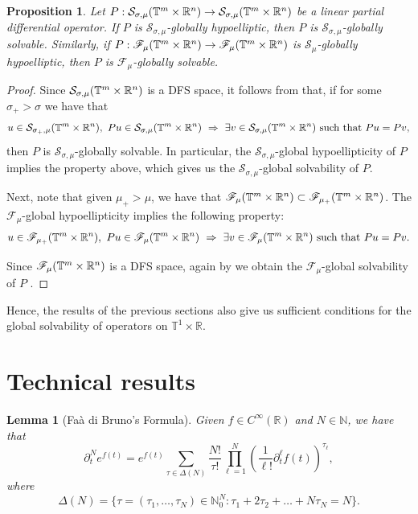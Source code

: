 \documentclass[11pt,reqno]{amsart}
\numberwithin{equation}{section}
\newtheorem{prop}[theorem]{Proposition}
\newtheorem{lemma}[theorem]{Lemma}
\theoremstyle{definition}
\theoremstyle{definition}
\newcommand{\T}{\mathbb{T}}
\newcommand{\G}{\mathnormal{\mathbb{T}^{m}\times\mathbb{R}^n}}
\newcommand{\R}{\mathbb{R}}
\newcommand{\N}{\mathbb{N}}
\renewcommand{\S}{\mathcal{S}_{\sigma,\mu}(\G)}
\begin{document}
\begin{prop}
    Let $P:\S\to\S$ be a linear partial differential operator. If $P$ is $\mathcal{S}_{\sigma,\mu}$-globally hypoelliptic, then $P$ is $\mathcal{S}_{\sigma,\mu}$-globally solvable. Similarly, if $P:\mathscr{F}_\mu(\G)\to \mathscr{F}_\mu(\G)$ is $\mathcal{S}_{\mu}$-globally hypoelliptic, then $P$ is $\mathscr{F}_{\mu}$-globally solvable.
\end{prop}
\begin{proof}
    Since $\S$ is a DFS space, it follows from \cite[Corollary 5.4]{AFR22proc} that, if for some $\sigma_+>\sigma$ we have that
    \[u\in\mathcal{S}_{\sigma_+,\mu}(\G),\ Pu\in\S\ \Rightarrow\ \exists v\in \mathcal{S}_{\sigma,\mu}(\G)\text{ such that }Pu=Pv,\]
    then $P$ is $\mathcal{S}_{\sigma,\mu}$-globally solvable. In particular, the $\mathcal{S}_{\sigma,\mu}$-global hypoellipticity of $P$ implies the property above, which gives us the $\mathcal{S}_{\sigma,\mu}$-global solvability of $P$. 
    
    Next, note that given $\mu_+>\mu$, we have that $\mathscr{F}_\mu(\G)\subset \mathscr{F}_{\mu_+}(\G)$. The $\mathscr{F}_\mu$-global hypoellipticity implies the following property:
    \[u\in\mathscr{F}_{\mu_+}(\G),\ Pu\in\mathscr{F}_\mu(\G)\ \Rightarrow\ \exists v\in \mathscr{F}_\mu(\G)\text{ such that }Pu=Pv.\]
    
  Since $\mathscr{F}_\mu(\G)$ is a DFS space, again by \cite[Corollary 5.4]{AFR22proc} we obtain the $\mathscr{F}_\mu$-global solvability of $P$ .
\end{proof}

Hence, the results of the previous sections also give us sufficient conditions for the global solvability of operators on $\T^1\times\R$.


\appendix\section{Technical results}\label{appendix}

\begin{lemma}[Fa\`a di Bruno's Formula]\label{faa}
	Given $f\in C^\infty(\mathbb{R})$ and $N\in\mathbb{N}$, we have that
	\begin{equation*}{\partial_t^N}e^{f(t)}=e^{f(t)}\displaystyle\sum_{\tau\in\Delta(N)}\dfrac{N!}{\tau!}\prod_{\ell=1}^{N}\left(\dfrac{1}{\ell!}\partial_t^\ell f(t)\right)^{\tau_\ell},
    \end{equation*}
    where
    \begin{equation}\label{Delta_set_defi}
    \Delta(N)=\{\tau=(\tau_1,\dots,\tau_N)\in\N_0^{N}:\tau_1+2\tau_2+\dots+N\tau_N=N\}.
\end{equation}
\end{lemma}
\end{document}
